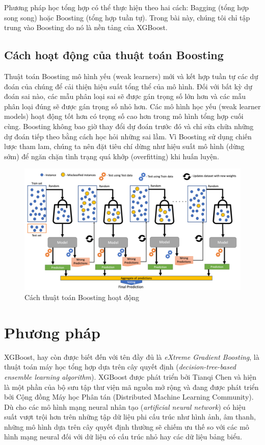 \documentclass{article}
\begin{document}
Phương pháp học tổng hợp có thể thực hiện theo hai cách: Bagging (tổng hợp song song) hoặc Boosting (tổng hợp tuần tự). Trong bài này, chúng tôi chỉ tập trung vào Boosting do nó là nền tảng của XGBoost.

\subsection{Cách hoạt động của thuật toán Boosting}
Thuật toán Boosting mô hình yếu (weak learners) mới và kết hợp tuần tự các dự đoán của chúng để cải thiện hiệu suất tổng thể của mô hình. Đối với bất kỳ dự đoán sai nào, các mẫu phân loại sai sẽ được gán trọng số lớn hơn và các mẫu phân loại đúng sẽ được gán trọng số nhỏ hơn. Các mô hình học yếu (weak learner models) hoạt động tốt hơn có trọng số cao hơn trong mô hình tổng hợp cuối cùng. Boosting không bao giờ thay đổi dự đoán trước đó và chỉ sửa chữa những dự đoán tiếp theo bằng cách học hỏi những sai lầm. Vì Boosting sử dụng chiến lược tham lam, chúng ta nên đặt tiêu chí dừng như hiệu suất mô hình (dừng sớm) để ngăn chặn tình trạng quá khớp (overfitting) khi huấn luyện. 

\begin{center} 
\begin{figure}[!h]
    \centering
    \includegraphics[scale=0.20]{boosting-algo.png}
    \caption{Cách thuật toán Boosting hoạt động \cite{An-xgboost}}
    \label{fig: boosting-algo}
\end{figure}
\end{center}

\section{Phương pháp} 
 
XGBoost, hay còn được biết đến với tên đầy đủ là  \textit{eXtreme Gradient Boosting}, là thuật toán máy học tổng hợp dựa trên cây quyết định (\textit{decision-tree-based ensemble learning algorithm}). XGBoost được phát triển bởi Tianqi Chen và hiện là một phần của bộ sưu tập thư viện mã nguồn mở rộng và đang được phát triển bởi Cộng đồng Máy học Phân tán (Distributed Machine Learning Community). Dù cho các mô hình mạng neural nhân tạo \cite{ANN} (\textit{artificial neural network}) có hiệu suất vượt trội hơn trên những tập dữ liệu phi cấu trúc như hình ảnh, âm thanh, những mô hình dựa trên cây quyết định thường sẽ chiếm ưu thế so với các mô hình mạng neural đối với dữ liệu có cấu trúc nhỏ hay các dữ liệu bảng biểu. 
\end{document}
